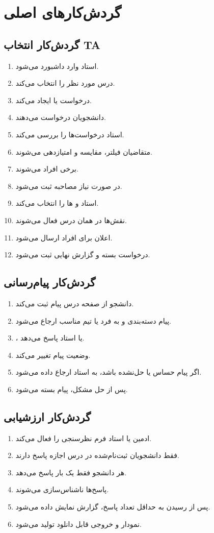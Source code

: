 \documentclass[12pt,a4paper]{article}
\begin{document}
\section{گردش‌کارهای اصلی}
\subsection{گردش‌کار انتخاب TA}
\begin{enumerate}
\item استاد وارد داشبورد می‌شود.
\item درس مورد نظر را انتخاب می‌کند.
\item درخواست  یا  ایجاد می‌کند.
\item دانشجویان درخواست می‌دهند.
\item استاد درخواست‌ها را بررسی می‌کند.
\item متقاضیان فیلتر، مقایسه و امتیازدهی می‌شوند.
\item برخی افراد  می‌شوند.
\item در صورت نیاز مصاحبه ثبت می‌شود.
\item استاد  و ها را انتخاب می‌کند.
\item نقش‌ها در همان درس فعال می‌شوند.
\item اعلان برای افراد ارسال می‌شود.
\item درخواست بسته و گزارش نهایی ثبت می‌شود.
\end{enumerate}

\subsection{گردش‌کار پیام‌رسانی}
\begin{enumerate}
\item دانشجو از صفحه درس پیام ثبت می‌کند.
\item پیام دسته‌بندی و به فرد یا تیم مناسب ارجاع می‌شود.
\item {}،  یا استاد پاسخ می‌دهد.
\item وضعیت پیام تغییر می‌کند.
\item اگر پیام حساس یا حل‌نشده باشد، به استاد ارجاع داده می‌شود.
\item پس از حل مشکل، پیام بسته می‌شود.
\end{enumerate}

\subsection{گردش‌کار ارزشیابی}
\begin{enumerate}
\item ادمین یا استاد فرم نظرسنجی را فعال می‌کند.
\item فقط دانشجویان ثبت‌نام‌شده در درس اجازه پاسخ دارند.
\item هر دانشجو فقط یک بار پاسخ می‌دهد.
\item پاسخ‌ها ناشناس‌سازی می‌شوند.
\item پس از رسیدن به حداقل تعداد پاسخ، گزارش نمایش داده می‌شود.
\item نمودار و خروجی قابل دانلود تولید می‌شود.
\end{enumerate}
\end{document}

